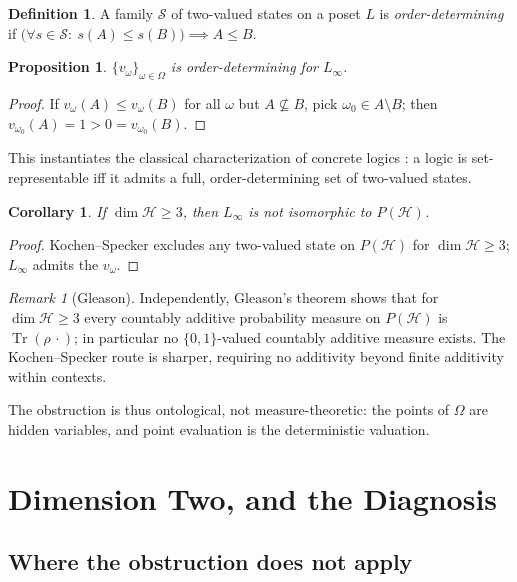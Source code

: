 \documentclass[11pt]{article}
\newtheorem{proposition}[theorem]{Proposition}
\newtheorem{corollary}[theorem]{Corollary}
\theoremstyle{definition}
\newtheorem{definition}[theorem]{Definition}
\theoremstyle{remark}
\newtheorem{remark}[theorem]{Remark}
\newcommand{\Hi}{\mathcal{H}}
\newcommand{\PH}{P(\Hi)}
\newcommand{\Linf}{L_{\infty}}
\newcommand{\Om}{\Omega}
\newcommand{\Tr}{\operatorname{Tr}}
\begin{document}
\begin{definition}
A family $\mathcal{S}$ of two-valued states on a poset $L$ is
\emph{order-determining} if
$\bigl(\forall s\in\mathcal S:\ s(A)\le s(B)\bigr)\implies A\le B$.
\end{definition}

\begin{proposition}\label{prop:od}
$\{v_{\omega}\}_{\omega\in\Om}$ is order-determining for $\Linf$.
\end{proposition}

\begin{proof}
If $v_\omega(A)\le v_\omega(B)$ for all $\omega$ but $A\not\subseteq B$,
pick $\omega_{0}\in A\setminus B$; then
$v_{\omega_{0}}(A)=1>0=v_{\omega_{0}}(B)$.
\end{proof}

This instantiates the classical characterization of concrete logics
\cite{Gudder1988,PtakPulmannova1991}: a logic is set-representable iff it
admits a full, order-determining set of two-valued states.

\begin{corollary}\label{cor:ks}
If $\dim\Hi\ge 3$, then $\Linf$ is not isomorphic to $\PH$.
\end{corollary}

\begin{proof}
Kochen--Specker \cite{KochenSpecker1967} excludes any two-valued state
on $\PH$ for $\dim\Hi\ge3$; $\Linf$ admits the $v_\omega$.
\end{proof}

\begin{remark}[Gleason]\label{rem:gleason}
Independently, Gleason's theorem \cite{Gleason1957} shows that for
$\dim\Hi\ge3$ every countably additive probability measure on $\PH$ is
$\Tr(\rho\,\cdot)$; in particular no $\{0,1\}$-valued countably additive
measure exists. The Kochen--Specker route is sharper, requiring no
additivity beyond finite additivity within contexts.
\end{remark}

The obstruction is thus ontological, not measure-theoretic: the points
of $\Om$ are hidden variables, and point evaluation is the deterministic
valuation.

\section{Dimension Two, and the Diagnosis}\label{sec:dimtwo}

\subsection{Where the obstruction does not apply}
\end{document}
